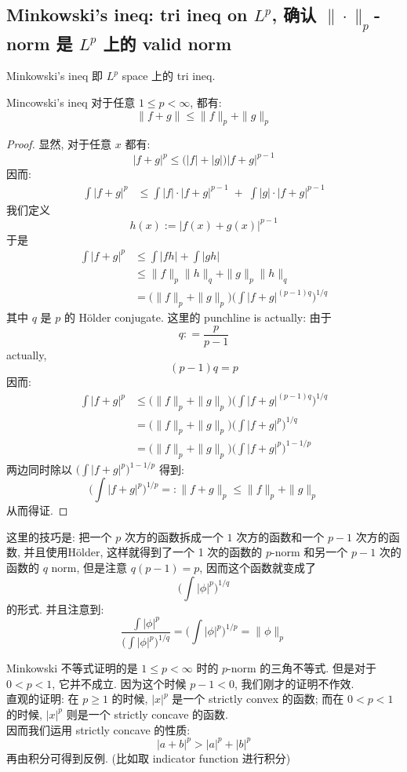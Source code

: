 \documentclass[lang=cn,11pt]{elegantbook}
\begin{document}
\subsection{Minkowski's ineq: tri ineq on $L^p$, 确认 $\|\cdot\|_p$-norm 是 $L^p$ 上的 valid norm }
Minkowski's ineq 即 $L^p$ space 上的 tri ineq.
\begin{corollary}{Mincowski's ineq}
对于任意 $1\leq p < \infty$, 都有: \[
\|f +g \| \leq \|f\|_p  + \| g\|_p
\]
\end{corollary}
\begin{proof}
显然, 对于任意 $x$ 都有: \[
    |f + g|^p \leq \bigg( |f| + |g|\bigg) |f+g|^{p-1} 
    \]
    因而: \begin{align*}
           \int |f + g|^p &\leq \int |f| \cdot |f+g|^{p-1} \; + \; \int |g| \cdot |f+g|^{p-1}
    \end{align*}
    我们定义 $$h(x):= |f(x)+g(x)|^{p-1}$$于是 \begin{align*}
          \int  |f + g|^p &\leq \int |fh| + \int |gh| \\
            &\leq \|f\|_p \| h\|_q + \|g\|_p \| h\|_q \\
            &= \bigg(\|f\|_p + \|g\|_p \bigg)  \bigg(\int |f+g|^{(p-1)q}\bigg )^{1/q}
    \end{align*}
其中 $q$ 是 $p$ 的 Hölder conjugate.  这里的 punchline is actually: 由于 \[
q : = \frac{p}{p-1}
\] actually, \[
(p-1)q = p
\]
因而: 
\begin{align*}
        \int  |f + g|^p  &\leq \bigg(\|f\|_p + \|g\|_p \bigg)  \bigg(\int |f+g|^{(p-1)q}\bigg )^{1/q}\\ &= \bigg(\|f\|_p + \|g\|_p \bigg)  \bigg(\int |f+g|^{p}\bigg )^{1/q}\\
        & = \bigg(\|f\|_p + \|g\|_p \bigg)  \bigg(\int |f+g|^{p}\bigg )^{1-1/p}
\end{align*}
两边同时除以 $\big(\int |f+g|^{p}\big )^{1-1/p}$  得到: \[
\bigg(  \int  |f + g|^p \bigg)^{1/p} =: \| f+g\|_p \leq \|f\|_p + \|g\|_p
\]
从而得证.
\end{proof}
\begin{remark}
    这里的技巧是: 把一个 $p$ 次方的函数拆成一个 $1$ 次方的函数和一个 $p-1$ 次方的函数, 并且使用Hölder, 这样就得到了一个 1 次的函数的 $p$-norm 和另一个 $p-1$ 次的函数的 $q$ norm, 但是注意 $q(p-1) = p$, 因而这个函数就变成了 \[
    \bigg( \int |\phi|^p \bigg)^{1/q}
    \]的形式. 并且注意到: \[
    \frac{ \displaystyle \int |\phi|^p }{    \bigg( \displaystyle\int |\phi|^p  \bigg)^{1/q}} = \bigg( \displaystyle\int |\phi|^p  \bigg)^{1/p} = \|\phi\|_p
    \]
\end{remark}
\begin{remark}
    Minkowski 不等式证明的是 \(1\leq p < \infty\) 时的 $p$-norm 的三角不等式. 但是对于 $0<p<1$, 它并不成立. 因为这个时候 $p-1< 0$, 我们刚才的证明不作效.\\
    直观的证明: 在 $p\geq 1$ 的时候, $|x|^p$ 是一个 strictly convex 的函数; 而在 $0< p<1$ 的时候, $|x|^p$ 则是一个 strictly concave 的函数.\\
因而我们运用 strictly concave 的性质: \[
|a+b|^p > |a|^p + |b|^p
\]
再由积分可得到反例. (比如取 indicator function 进行积分)
\end{remark}
\end{document}
